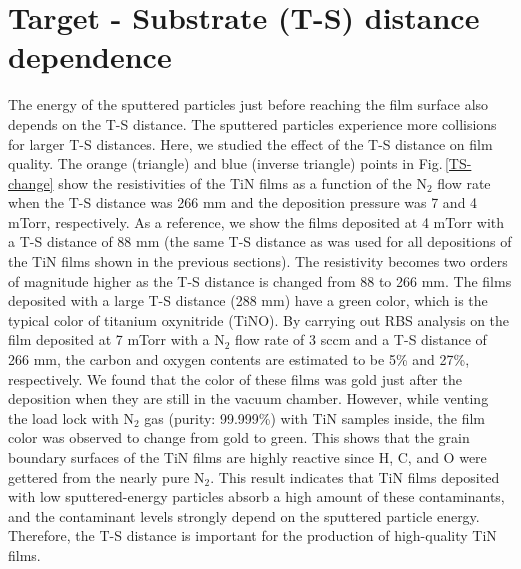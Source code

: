\section{Target - Substrate (T-S) distance dependence}
\label{T-S DISTANCE DEPENDENCE}
The energy of the sputtered particles just before reaching the film surface also depends on the T-S distance. The sputtered particles experience more collisions for larger T-S distances. Here, we studied the effect of the T-S distance on film quality. The orange (triangle) and blue (inverse triangle) points in Fig.\,\ref{TS-change} show the resistivities of the TiN films as a function of the N$_{2}$ flow rate when the T-S distance was 266 mm and the deposition pressure was 7 and 4 mTorr, respectively. As a reference, we show the films deposited at 4 mTorr with a T-S distance of 88 mm (the same T-S distance as was used for all depositions of the TiN films shown in the previous sections). The resistivity becomes two orders of magnitude higher as the T-S distance is changed from 88 to 266 mm. The films deposited with a large T-S distance (288 mm) have a green color, which is the typical color of titanium oxynitride (TiNO). By carrying out RBS analysis on the film deposited at 7 mTorr with a N$_{2}$ flow rate of 3 sccm and a T-S distance of 266 mm, the carbon and oxygen contents are estimated to be 5\% and 27\%, respectively. We found that the color of these films was gold just after the deposition when they are still in the vacuum chamber. However, while venting the load lock with N$_{2}$ gas (purity: 99.999\%) with TiN samples inside, the film color was observed to change from gold to green.  This shows that the grain boundary surfaces of the TiN films are highly reactive since H, C, and O were gettered from the nearly pure N$_{2}$. This result indicates that TiN films deposited with low sputtered-energy particles absorb a high amount of these contaminants, and the contaminant levels strongly depend on the sputtered particle energy. Therefore, the T-S distance is important for the production of high-quality TiN films.\cite{T-SComment}
